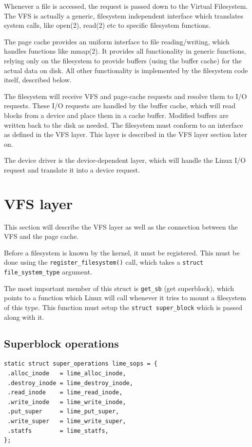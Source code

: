 Whenever a file is accessed, the request is passed down to the Virtual Filesystem. The VFS is actually a generic, filesystem independent interface which translates system calls, like open(2), read(2) etc to specific filesystem functions.

The page cache provides an uniform interface to file reading/writing, which handles functions like mmap(2). It provides all functionality in generic functions, relying only on the filesystem to provide buffers (using the buffer cache) for the actual data on disk. All other functionality is implemented by the filesystem code itself, described below.

The filesystem will receive VFS and page-cache requests and resolve them to I/O requests. These I/O requests are handled by the buffer cache, which will read blocks from a device and place them in a cache buffer. Modified buffers are written back to the disk as needed. The filesystem must conform to an interface as defined in the VFS layer. This layer is described in the VFS layer section later on.

The device driver is the device-dependent layer, which will handle the Linux I/O request and translate it into a device request.

\section{VFS layer}

This section will describe the VFS layer as well as the connection between the VFS and the page cache.

Before a filesystem is known by the kernel, it must be registered. This must be done using the \texttt{register\_filesystem()} call, which takes a \texttt{struct file\_system\_type} argument.

The most important member of this struct is \texttt{get\_sb} (get superblock), which points to a function which Linux will call whenever it tries to mount a filesystem of this type. This function must setup the \texttt{struct super\_block} which is passed along with it.

\subsection{Superblock operations}

\begin{verbatim}
static struct super_operations lime_sops = {
 .alloc_inode   = lime_alloc_inode,
 .destroy_inode = lime_destroy_inode,
 .read_inode    = lime_read_inode,
 .write_inode   = lime_write_inode,
 .put_super     = lime_put_super,
 .write_super   = lime_write_super,
 .statfs        = lime_statfs,
};
\end{verbatim}

